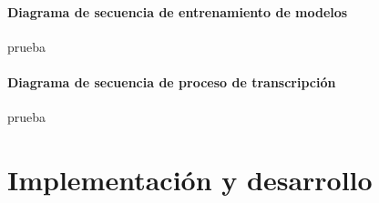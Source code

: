 \documentclass[../main.tex]{subfiles}
\begin{document}
\paragraph{Diagrama de secuencia de entrenamiento de modelos}
prueba
\paragraph{Diagrama de secuencia de proceso de transcripción}
prueba

\section{Implementación y desarrollo}\label{sec:implementacion}
\end{document}
